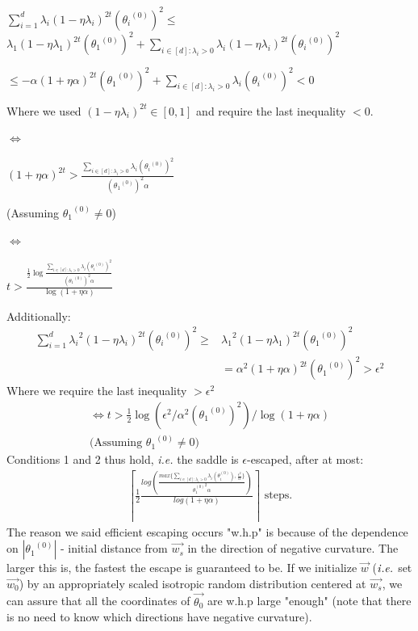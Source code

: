 \documentclass[12pt]{article}
\newcommand{\ceil}[1]{\left\lceil #1 \right\rceil}
\newcommand{\ie}{{\it i.e. }}
\begin{document}
    ${\sum_{i=1}^{d} {\lambda_i}{(1 - \eta\lambda_i)}^{2t}{({\theta_i}^{(0)})}^{2}} \leq  $ $ {\lambda_1}{(1 - \eta\lambda_1)}^{2t}{({\theta_1}^{(0)})}^{2} + {\sum_{i\in[d]: {\lambda_i > 0}} {\lambda_i}{(1 - \eta\lambda_i)}^{2t}{({\theta_i}^{(0)})}^{2}}  $
    
    $ \leq {-\alpha}{(1 + \eta\alpha)}^{2t}{({\theta_1}^{(0)})}^{2} + {\sum_{i\in[d]: {\lambda_i > 0}} {\lambda_i}{({\theta_i}^{(0)})}^{2}} < 0 $ 
    
    Where we used ${{(1 - \eta\lambda_i)}^{2t} \in [0,1]}$  and require the last inequality $< 0$.
    
    $\Longleftrightarrow$
    
    ${(1 + \eta\alpha)}^{2t} > {\frac{\sum_{i\in[d]: {\lambda_i > 0}} {\lambda_i}{({\theta_i}^{(0)})}^{2}}{({\theta_1}^{(0)})^2\alpha}}$
    
    (Assuming ${\theta_1}^{(0)} \ne 0$)
    
    $\Longleftrightarrow$
    
    $t > \frac{\frac{1}{2}\log {\frac{\sum_{i\in[d]: {\lambda_i > 0}} {\lambda_i}{({\theta_i}^{(0)})}^{2}}{({\theta_1}^{(0)})^{2}\alpha}}}{\log {(1+\eta\alpha)}}$
    
	\newpage
	Additionally:
	\begin{align*}
	{\sum_{i=1}^{d} {{\lambda_i}^{2}}{(1 - \eta\lambda_i)}^{2t}{({\theta_i}^{(0)})}^{2}} \geq & {{\lambda_1}^{2}}{(1 - \eta\lambda_1)}^{2t}{({\theta_1}^{(0)})}^{2} \\
	& = {{\alpha}^{2}}{(1 + \eta\alpha)}^{2t}{({\theta_1}^{(0)})}^{2} > {{\epsilon} ^{2}}
	\end{align*}
	Where we require the last inequality $>\epsilon^{2}$
	\begin{align*}
	    \Longleftrightarrow
    	t > {\frac{1}{2}\log {({{\epsilon}^{2}} / { \alpha^2 ({\theta_1}^{(0)})^{2}})}} / {\log {(1+\eta\alpha)}} \\
    	\text{(Assuming ${\theta_1}^{(0)} \ne 0$)}
	\end{align*}
	Conditions 1 and 2 thus hold, \ie the saddle is $\epsilon$-escaped, after at most:
	\begin{align*}
	    \ceil{\frac{1}{2} \frac{log\left(\frac{max\{\sum_{i\in[d]: {\lambda_i > 0}} {\lambda_i (\theta_i^{(0)})}, \frac{\epsilon^2}{\alpha} \}}{{{\theta_1^{(0)}}^2}\alpha}\right)}{log(1+\eta\alpha)}} \text{ steps.}
	\end{align*}
	The reason we said efficient escaping occurs "w.h.p" is because of the dependence on $|{\theta_1}^{(0)}|$ - initial distance from $\overrightarrow{w_s}$ in the direction of negative curvature. The larger this is, the fastest the escape is guaranteed to be. If we initialize $\overrightarrow{w}$ ($\ie$  set $\overrightarrow{w_0}$) by an appropriately scaled isotropic random distribution centered at $\overrightarrow{w_s}$, we can assure that all the coordinates of $\overrightarrow{\theta_0}$ are w.h.p large "enough" (note that there is no need to know which directions have negative curvature).
\end{document}
